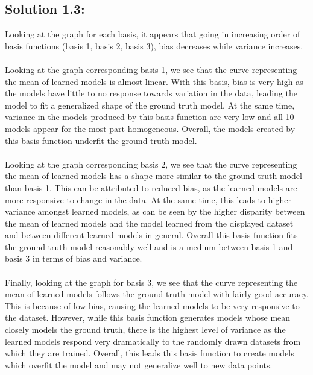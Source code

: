 \documentclass[submit]{harvardml}
\begin{document}
\begin{center}
\end{center}

\subsection*{Solution 1.3:}
Looking at the graph for each basis, it appears that going in increasing order of basis functions (basis 1, basis 2, basis 3), bias decreases while variance increases. 
\\ \\
Looking at the graph corresponding basis 1, we see that the curve representing the mean of learned models is almost linear. With this basis, bias is very high as the models have little to no response towards variation in the data, leading the model to fit a generalized shape of the ground truth model. At the same time, variance in the models produced by this basis function are very low and all 10 models appear for the most part homogeneous. Overall, the models created by this basis function underfit the ground truth model.
\\ \\
Looking at the graph corresponding basis 2, we see that the curve representing the mean of learned models has a shape more similar to the ground truth model than basis 1. This can be attributed to reduced bias, as the learned models are more responsive to change in the data. At the same time, this leads to higher variance amongst learned models, as can be seen by the higher disparity between the mean of learned models and the model learned from the displayed dataset and between different learned models in general. Overall this basis function fits the ground truth model reasonably well and is a medium between basis 1 and basis 3 in terms of bias and variance.
\\ \\
Finally, looking at the graph for basis 3, we see that the curve representing the mean of learned models follows the ground truth model with fairly good accuracy. This is because of low bias, causing the learned models to be very responsive to the dataset. However, while this basis function generates models whose mean closely models the ground truth, there is the highest level of variance as the learned models respond very dramatically to the randomly drawn datasets from which they are trained. Overall, this leads this basis function to create models which overfit the model and may not generalize well to new data points.
\end{document}
